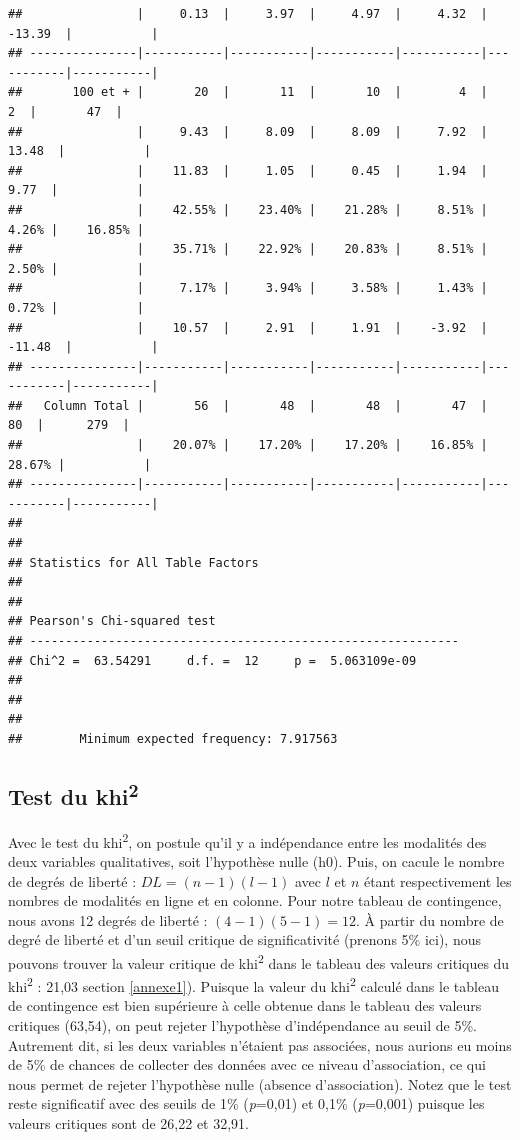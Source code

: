 \documentclass[
  11pt,
  french,
]{book}
\begin{document}
\begin{verbatim}
##                |     0.13  |     3.97  |     4.97  |     4.32  |   -13.39  |           | 
## ---------------|-----------|-----------|-----------|-----------|-----------|-----------|
##       100 et + |       20  |       11  |       10  |        4  |        2  |       47  | 
##                |     9.43  |     8.09  |     8.09  |     7.92  |    13.48  |           | 
##                |    11.83  |     1.05  |     0.45  |     1.94  |     9.77  |           | 
##                |    42.55% |    23.40% |    21.28% |     8.51% |     4.26% |    16.85% | 
##                |    35.71% |    22.92% |    20.83% |     8.51% |     2.50% |           | 
##                |     7.17% |     3.94% |     3.58% |     1.43% |     0.72% |           | 
##                |    10.57  |     2.91  |     1.91  |    -3.92  |   -11.48  |           | 
## ---------------|-----------|-----------|-----------|-----------|-----------|-----------|
##   Column Total |       56  |       48  |       48  |       47  |       80  |      279  | 
##                |    20.07% |    17.20% |    17.20% |    16.85% |    28.67% |           | 
## ---------------|-----------|-----------|-----------|-----------|-----------|-----------|
## 
##  
## Statistics for All Table Factors
## 
## 
## Pearson's Chi-squared test 
## ------------------------------------------------------------
## Chi^2 =  63.54291     d.f. =  12     p =  5.063109e-09 
## 
## 
##  
##        Minimum expected frequency: 7.917563
\end{verbatim}

\hypertarget{sect0422}{%
\subsection{\texorpdfstring{Test du khi\textsuperscript{2}}{Test du khi2}}\label{sect0422}}

Avec le test du khi\textsuperscript{2}, on postule qu'il y a indépendance entre les modalités des deux variables qualitatives, soit l'hypothèse nulle (h0). Puis, on cacule le nombre de degrés de liberté : \(DL = (n-1)(l-1)\) avec \(l\) et \(n\) étant respectivement les nombres de modalités en ligne et en colonne. Pour notre tableau de contingence, nous avons 12 degrés de liberté : \((4-1)(5-1)=12\). À partir du nombre de degré de liberté et d'un seuil critique de significativité (prenons 5\% ici), nous pouvons trouver la valeur critique de khi\textsuperscript{2} dans le tableau des valeurs critiques du khi\textsuperscript{2} : 21,03 section \ref{annexe1}). Puisque la valeur du khi\textsuperscript{2} calculé dans le tableau de contingence est bien supérieure à celle obtenue dans le tableau des valeurs critiques (63,54), on peut rejeter l'hypothèse d'indépendance au seuil de 5\%. Autrement dit, si les deux variables n'étaient pas associées, nous aurions eu moins de 5\% de chances de collecter des données avec ce niveau d'association, ce qui nous permet de rejeter l'hypothèse nulle (absence d'association). Notez que le test reste significatif avec des seuils de 1\% (\emph{p}=0,01) et 0,1\% (\emph{p}=0,001) puisque les valeurs critiques sont de 26,22 et 32,91.
\end{document}
